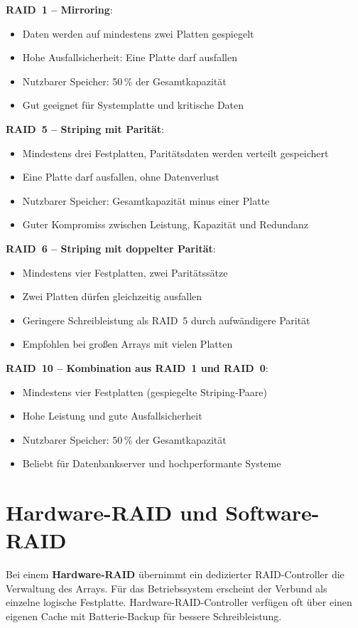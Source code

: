 \documentclass[11pt, oneside, numbers=noenddot]{scrbook}
\begin{document}
\textbf{RAID~1 -- Mirroring}:
\begin{itemize}
  \item Daten werden auf mindestens zwei Platten gespiegelt
  \item Hohe Ausfallsicherheit: Eine Platte darf ausfallen
  \item Nutzbarer Speicher: 50\,\% der Gesamtkapazität
  \item Gut geeignet für Systemplatte und kritische Daten
\end{itemize}
\newpage
\textbf{RAID~5 -- Striping mit Parität}:
\begin{itemize}
  \item Mindestens drei Festplatten, Paritätsdaten werden verteilt gespeichert
  \item Eine Platte darf ausfallen, ohne Datenverlust
  \item Nutzbarer Speicher: Gesamtkapazität minus einer Platte
  \item Guter Kompromiss zwischen Leistung, Kapazität und Redundanz
\end{itemize}

\textbf{RAID~6 -- Striping mit doppelter Parität}:
\begin{itemize}
  \item Mindestens vier Festplatten, zwei Paritätssätze
  \item Zwei Platten dürfen gleichzeitig ausfallen
  \item Geringere Schreibleistung als RAID~5 durch aufwändigere Parität
  \item Empfohlen bei großen Arrays mit vielen Platten
\end{itemize}

\textbf{RAID~10 -- Kombination aus RAID~1 und RAID~0}:
\begin{itemize}
  \item Mindestens vier Festplatten (gespiegelte Striping-Paare)
  \item Hohe Leistung und gute Ausfallsicherheit
  \item Nutzbarer Speicher: 50\,\% der Gesamtkapazität
  \item Beliebt für Datenbankserver und hochperformante Systeme
\end{itemize}
\newpage
\section{Hardware-RAID und Software-RAID}
Bei einem \textbf{Hardware-RAID} übernimmt ein dedizierter RAID-Controller die Verwaltung des Arrays. Für das Betriebssystem erscheint der Verbund als einzelne logische Festplatte. Hardware-RAID-Controller verfügen oft über einen eigenen Cache mit Batterie-Backup für bessere Schreibleistung.
\end{document}
